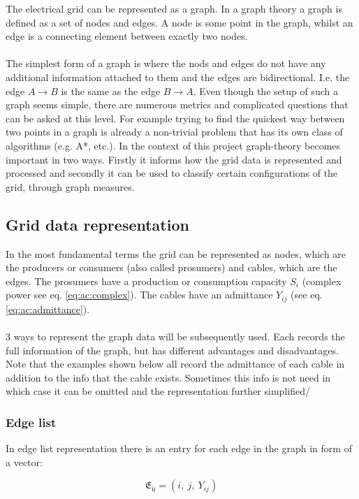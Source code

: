 The electrical grid can be represented as a graph. 
In a graph theory a graph is defined as a set of nodes and edges. A node
is some point in the graph, whilst an edge is a connecting element between exactly
two nodes.\\
\\

The simplest form of a graph is where the nods and edges do not have
any additional information attached to them and the edges are bidirectional.
I.e. the edge $A \to B$ is the same as the edge $B \to A$. Even though the setup
of such a graph seems simple, there are numerous metrics and complicated questions
that can be asked at this level. For example trying to find the quickest way between
two points in a graph is already a non-trivial problem that has its own class of algorithms
(e.g. A*, etc.). In the context of this project graph-theory becomes important in two ways.
Firstly it informs how the grid data is represented and processed and secondly it can
be used to classify certain configurations of the grid, through graph measures.

\subsection{Grid data representation}

In the most fundamental terms the grid can be represented as nodes, which are the 
producers or consumers (also called prosumers) and cables, which are the edges.
The prosumers have a production or consumption capacity $S_i$ (complex power see eq. \ref{eq:ac:complex}).
The cables have an admittance $Y_{ij}$ (see eq. \ref{eq:ac:admittance}).\\
\\
3 ways to represent the graph data will be subsequently used. 
Each records the full information of the graph, but
has different advantages and disadvantages. Note that the examples shown below all record
the admittance of each cable in addition to the info that the cable exists. Sometimes
this info is not need in which case it can be omitted and the representation further simplified/

\subsubsection{Edge list}

In edge list representation there is an entry for each edge in the graph in form of a vector:

\begin{equation}    
    \mathfrak{E_{ij}} = (i,\ j,\ Y_{ij})
    \label{eq:graph_theory:edge_list}
\end{equation}

